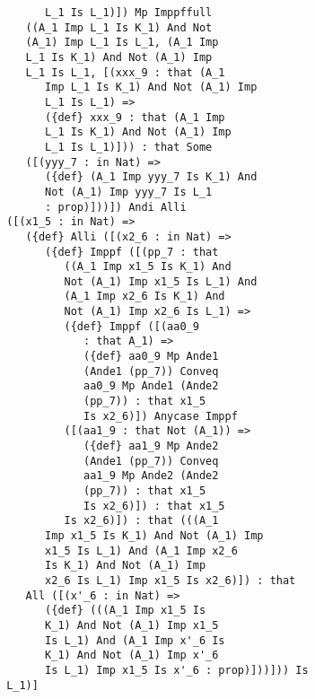 \documentclass{article}
\begin{document}
\begin{verbatim}
             L_1 Is L_1)]) Mp Imppffull 
          ((A_1 Imp L_1 Is K_1) And Not 
          (A_1) Imp L_1 Is L_1, (A_1 Imp 
          L_1 Is K_1) And Not (A_1) Imp 
          L_1 Is L_1, [(xxx_9 : that (A_1 
             Imp L_1 Is K_1) And Not (A_1) Imp 
             L_1 Is L_1) => 
             ({def} xxx_9 : that (A_1 Imp 
             L_1 Is K_1) And Not (A_1) Imp 
             L_1 Is L_1)])) : that Some 
          ([(yyy_7 : in Nat) => 
             ({def} (A_1 Imp yyy_7 Is K_1) And 
             Not (A_1) Imp yyy_7 Is L_1 
             : prop)]))]) Andi Alli 
       ([(x1_5 : in Nat) => 
          ({def} Alli ([(x2_6 : in Nat) => 
             ({def} Imppf ([(pp_7 : that 
                ((A_1 Imp x1_5 Is K_1) And 
                Not (A_1) Imp x1_5 Is L_1) And 
                (A_1 Imp x2_6 Is K_1) And 
                Not (A_1) Imp x2_6 Is L_1) => 
                ({def} Imppf ([(aa0_9 
                   : that A_1) => 
                   ({def} aa0_9 Mp Ande1 
                   (Ande1 (pp_7)) Conveq 
                   aa0_9 Mp Ande1 (Ande2 
                   (pp_7)) : that x1_5 
                   Is x2_6)]) Anycase Imppf 
                ([(aa1_9 : that Not (A_1)) => 
                   ({def} aa1_9 Mp Ande2 
                   (Ande1 (pp_7)) Conveq 
                   aa1_9 Mp Ande2 (Ande2 
                   (pp_7)) : that x1_5 
                   Is x2_6)]) : that x1_5 
                Is x2_6)]) : that (((A_1 
             Imp x1_5 Is K_1) And Not (A_1) Imp 
             x1_5 Is L_1) And (A_1 Imp x2_6 
             Is K_1) And Not (A_1) Imp 
             x2_6 Is L_1) Imp x1_5 Is x2_6)]) : that 
          All ([(x'_6 : in Nat) => 
             ({def} (((A_1 Imp x1_5 Is 
             K_1) And Not (A_1) Imp x1_5 
             Is L_1) And (A_1 Imp x'_6 Is 
             K_1) And Not (A_1) Imp x'_6 
             Is L_1) Imp x1_5 Is x'_6 : prop)]))])) Is 
       L_1)]



\end{verbatim}
\end{document}
